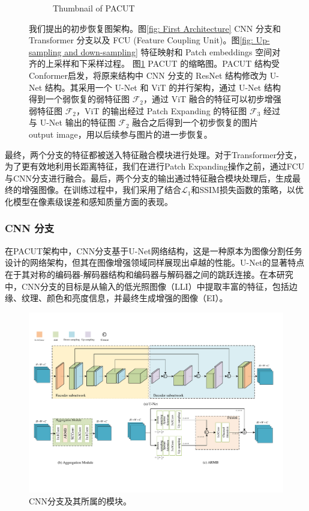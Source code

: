 \documentclass[a4paper]{ctexart}
\begin{document}
\begin{figure}[htb]
\begin{subfigure}{0.4\textwidth}
			\captionsetup{font=scriptsize}
			\caption{Thumbnail of PACUT}
			\label{fig: The proposed initial architecture(Abstract Picture)}	
		\end{subfigure}
		\caption{
			\label{fig: PACUT}
			我们提出的初步恢复图架构。图\ref{fig: First Architecture} CNN 分支和 Transformer 分支以及 FCU (Feature Coupling Unit)。图\ref{fig: Up-sampling and down-sampling} 特征映射和 Patch embeddings 空间对齐的上采样和下采样过程。 图\ref{fig: The proposed initial architecture(Abstract Picture)} PACUT 的缩略图。PACUT 结构受 Conformer\cite{peng2021conformer}启发，将原来结构中 CNN 分支的 ResNet 结构修改为 U-Net 结构。其采用一个 U-Net 和 ViT 的并行架构，通过 U-Net 结构得到一个弱恢复的弱特征图 $\mathcal{F}_2$，通过 ViT 融合的特征可以初步增强弱特征图 $\mathcal{F}_2$，ViT 的输出经过 Patch Expanding 的特征图 $\mathcal{F}_3$ 经过与 U-Net 输出的特征图 $\mathcal{F}_2$ 融合之后得到一个初步恢复的图片 output image，用以后续参与图片的进一步恢复。
		}
	\end{figure}
	\FloatBarrier
	最终，两个分支的特征都被送入特征融合模块进行处理。对于Transformer分支，为了更有效地利用长距离特征，我们在进行Patch Expanding操作之前，通过FCU与CNN分支进行融合。最后，两个分支的输出通过特征融合模块处理后，生成最终的增强图像。在训练过程中，我们采用了结合$\mathcal{L}_1$和SSIM损失函数的策略，以优化模型在像素级误差和感知质量方面的表现。
	
	\subsubsection{CNN 分支}
	
	在PACUT架构中，CNN分支基于U-Net网络结构，这是一种原本为图像分割任务设计的网络架构，但其在图像增强领域同样展现出卓越的性能。U-Net的显著特点在于其对称的编码器-解码器结构和编码器与解码器之间的跳跃连接。在本研究中，CNN分支的目标是从输入的低光照图像（LLI）中提取丰富的特征，包括边缘、纹理、颜色和亮度信息，并最终生成增强的图像（EI）。
	
	
	\begin{figure}[htb]
		\centering 
		\includegraphics[width=\columnwidth]{picture/LLIE/My Architecture/U-Net and AM}
			\caption{
				\label{fig: U-Net and AM} 
				CNN分支及其所属的模块。
			}
	\end{figure}
	
\end{document}
